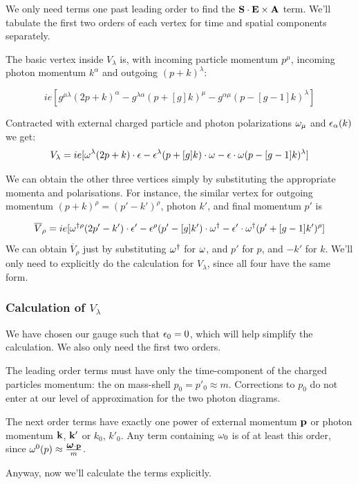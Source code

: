 We only need terms one past leading order to find the $\mathbf{S} \cdot \mathbf{E} \times \mathbf{A}$ term.  We'll tabulate the first two orders of each vertex for time and spatial components separately.  




The basic vertex inside $V_\lambda$ is, with incoming particle momentum $p^\mu$, incoming photon momentum $k^\alpha$ and outgoing $(p+k)^\lambda$:

\[
	ie[ g^{\mu\lambda}(2p + k)^\alpha - g^{\lambda \alpha} (p + [g]k)^\mu - g^{\alpha \mu} (p-[g-1]k)^\lambda ]
\]

Contracted with external charged particle and photon polarizations $\omega_\mu$ and $\epsilon_\alpha(k)$ we get:
\[
	V_\lambda = ie[\omega^\lambda (2p + k) \cdot \epsilon - \epsilon^\lambda (p+[g]k) \cdot \omega - \epsilon \cdot \omega (p-[g-1]k)^\lambda ]
\]
  
We can obtain the other three vertices simply by substituting the appropriate momenta and polarisations.  For instance, the similar vertex for outgoing momentum $(p+k)^\rho = (p' - k')^\rho$, photon $k'$, and final momentum $p'$ is

\[
	\overline{V}_\rho = ie[\omega^{\dagger\rho} (2p' - k') \cdot \epsilon' - \epsilon^\rho (p'-[g]k') \cdot \omega^\dagger  - \epsilon' \cdot \omega^\dagger  (p'+[g-1]k')^\rho ]
\]
We can obtain $\overline{V}_\rho$ just by substituting $\omega^\dagger$ for $\omega$, and $p'$ for $p$, and $-k'$ for $k$.  We'll only need to explicitly do the calculation for $V_\lambda$, since all four have the same form.



\subsubsection{Calculation of $V_\lambda$}
We have chosen our gauge such that $\epsilon_0=0$, which will help simplify the calculation.  We also only need the first two orders.

The leading order terms must have only the time-component of the charged particles momentum: the on mass-shell $p_0 = p'_0 \approx m$.  Corrections to $p_0$ do not enter at our level of approximation for the two photon diagrams. 

The next order terms have exactly one power of external momentum $\mathbf{p}$ or photon momentum $\mathbf{k}$, $\mathbf{k'}$ or $k_0$, $k'_0$.  Any term containing $\omega_0$ is of at least this order, since $\omega^0(p) \approx \frac{\mbox{\boldmath$ \omega $} \cdot \mathbf{p}}{m}$.

Anyway, now we'll calculate the terms explicitly.


